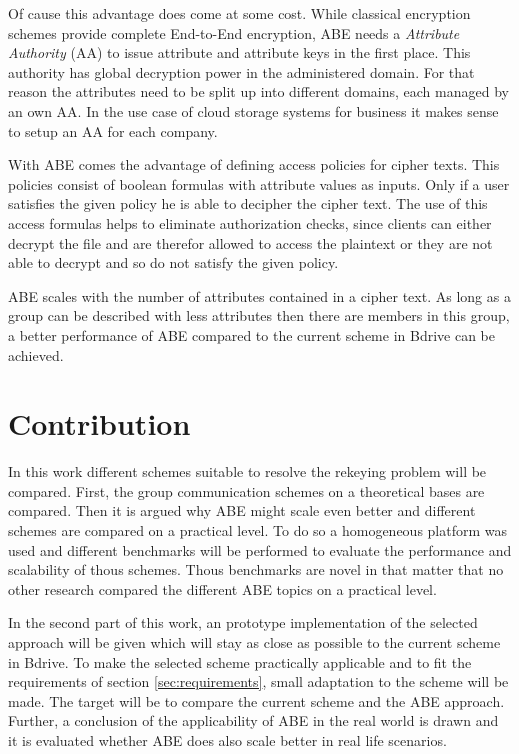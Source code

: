 Of cause this advantage does come at some cost. While classical encryption schemes provide complete End-to-End encryption, ABE needs a \textit{Attribute Authority} (\ac{AA}) to issue attribute and attribute keys in the first place. This authority has global decryption power in the administered domain. For that reason the attributes need to be split up into different domains, each managed by an own AA. In the use case of cloud storage systems for business it makes sense to setup an AA for each company. 

With ABE comes the advantage of defining access policies for cipher texts. This policies consist of boolean formulas with attribute values as inputs. Only if a user satisfies the given policy he is able to decipher the cipher text. The use of this access formulas helps to eliminate authorization checks, since clients can either decrypt the file and are therefor allowed to access the plaintext or they are not able to decrypt and so do not satisfy the given policy. 


ABE scales with the number of attributes contained in a cipher text. As long as a group can be described with less attributes then there are members in this group, a better performance of ABE compared to the current scheme in Bdrive can be achieved. 

\section{Contribution}
In this work different schemes suitable to resolve the rekeying problem will be compared. First, the group communication schemes on a theoretical bases are compared. Then it is argued why ABE might scale even better and different schemes are compared on a practical level. To do so a homogeneous platform was used and different benchmarks will be performed to evaluate the performance and scalability of thous schemes. Thous benchmarks are novel in that matter that no other research compared the different ABE topics on a practical level.  

In the second part of this work, an prototype implementation of the selected approach will be given which will stay as close as possible to the current scheme in Bdrive. To make the selected scheme practically applicable and to fit the requirements of section \ref{sec:requirements}, small adaptation to the scheme will be made. The target will be to compare the current scheme and the ABE approach. Further, a conclusion of the applicability of ABE in the real world is drawn and it is evaluated whether ABE does also scale better in real life scenarios. 